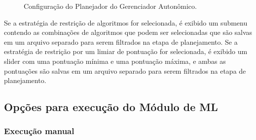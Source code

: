 \documentclass[portugues]{ic-tese}
\begin{document}
\begin{figure}[H]
    \centering
    \caption{Configuração do Planejador do Gerenciador Autonômico.}
    \label{fig:configPlanejamento}
\end{figure}

Se a estratégia de restrição de algoritmos for selecionada, é exibido um submenu contendo as combinações de algoritmos que podem ser selecionadas que são salvas em um arquivo separado para serem filtrados na etapa de planejamento. Se a estratégia de restrição por um limiar de pontuação for selecionada, é exibido um slider com uma pontuação mínima e uma pontuação máxima, e ambas as pontuações são salvas em um arquivo separado para serem filtrados na etapa de planejamento.

\subsection{Opções para execução do Módulo de ML}

\subsubsection{Execução manual}
\end{document}

